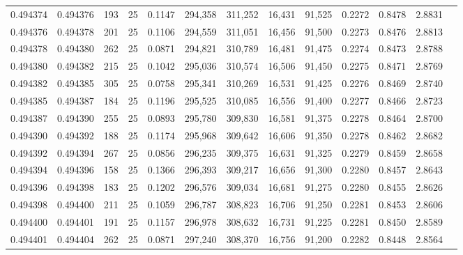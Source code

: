 \begin{tabular}{rrrrrrrrrrrrr}
0.494374 & 0.494376 &   193 &  25 &                                     0.1147 & 294,358 & 311,252 &  16,431 &  91,525 & 0.2272 & 0.8478 & 2.8831 \\
0.494376 & 0.494378 &   201 &  25 &                                     0.1106 & 294,559 & 311,051 &  16,456 &  91,500 & 0.2273 & 0.8476 & 2.8813 \\
0.494378 & 0.494380 &   262 &  25 &                                     0.0871 & 294,821 & 310,789 &  16,481 &  91,475 & 0.2274 & 0.8473 & 2.8788 \\
0.494380 & 0.494382 &   215 &  25 &                                     0.1042 & 295,036 & 310,574 &  16,506 &  91,450 & 0.2275 & 0.8471 & 2.8769 \\
0.494382 & 0.494385 &   305 &  25 &                                     0.0758 & 295,341 & 310,269 &  16,531 &  91,425 & 0.2276 & 0.8469 & 2.8740 \\
0.494385 & 0.494387 &   184 &  25 &                                     0.1196 & 295,525 & 310,085 &  16,556 &  91,400 & 0.2277 & 0.8466 & 2.8723 \\
0.494387 & 0.494390 &   255 &  25 &                                     0.0893 & 295,780 & 309,830 &  16,581 &  91,375 & 0.2278 & 0.8464 & 2.8700 \\
0.494390 & 0.494392 &   188 &  25 &                                     0.1174 & 295,968 & 309,642 &  16,606 &  91,350 & 0.2278 & 0.8462 & 2.8682 \\
0.494392 & 0.494394 &   267 &  25 &                                     0.0856 & 296,235 & 309,375 &  16,631 &  91,325 & 0.2279 & 0.8459 & 2.8658 \\
0.494394 & 0.494396 &   158 &  25 &                                     0.1366 & 296,393 & 309,217 &  16,656 &  91,300 & 0.2280 & 0.8457 & 2.8643 \\
0.494396 & 0.494398 &   183 &  25 &                                     0.1202 & 296,576 & 309,034 &  16,681 &  91,275 & 0.2280 & 0.8455 & 2.8626 \\
0.494398 & 0.494400 &   211 &  25 &                                     0.1059 & 296,787 & 308,823 &  16,706 &  91,250 & 0.2281 & 0.8453 & 2.8606 \\
0.494400 & 0.494401 &   191 &  25 &                                     0.1157 & 296,978 & 308,632 &  16,731 &  91,225 & 0.2281 & 0.8450 & 2.8589 \\
0.494401 & 0.494404 &   262 &  25 &                                     0.0871 & 297,240 & 308,370 &  16,756 &  91,200 & 0.2282 & 0.8448 & 2.8564 \\

\end{tabular}
